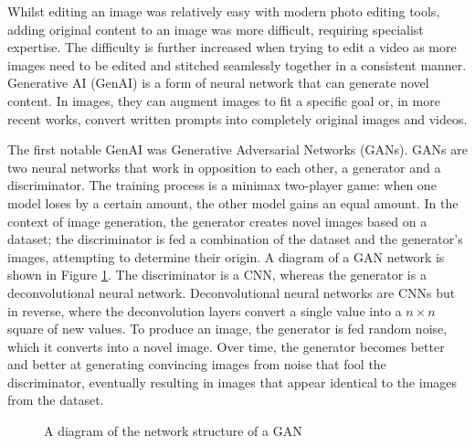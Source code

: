 Whilst editing an image was relatively easy with modern photo editing tools, adding original content to an image was more difficult, requiring specialist expertise. The difficulty is further increased when trying to edit a video as more images need to be edited and stitched seamlessly together in a consistent manner. Generative AI (GenAI) is a form of neural network that can generate novel content. In images, they can augment images to fit a specific goal or, in more recent works, convert written prompts into completely original images and videos.

The first notable GenAI was Generative Adversarial Networks (GANs)\cite{goodfellow2014generative}. GANs are two neural networks that work in opposition to each other, a generator and a discriminator. The training process is a minimax two-player game: when one model loses by a certain amount, the other model gains an equal amount. In the context of image generation, the generator creates novel images based on a dataset; the discriminator is fed a combination of the dataset and the generator's images, attempting to determine their origin. A diagram of a GAN network is shown in Figure \ref{fig:gan-diagram}. The discriminator is a CNN, whereas the generator is a deconvolutional neural network\cite{zeiler2011adaptive}. Deconvolutional neural networks are CNNs but in reverse, where the deconvolution layers convert a single value into a $n \times n$ square of new values. To produce an image, the generator is fed random noise, which it converts into a novel image. Over time, the generator becomes better and better at generating convincing images from noise that fool the discriminator, eventually resulting in images that appear identical to the images from the dataset. 

\begin{figure}[H]
    \centering
    \caption{A diagram of the network structure of a GAN}
    \label{fig:gan-diagram}
\end{figure}

